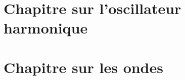 \documentclass{article}
\begin{document}
\section{Chapitre sur l'oscillateur harmonique}

\hfil

\bk

\hfil

\section{Chapitre sur les ondes}

\hfil

\bk
\end{document}
